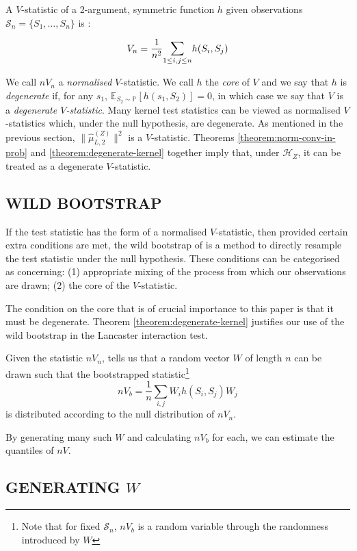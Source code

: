 \documentclass[]{article}
\begin{document}
  
A $V$-statistic of a 2-argument, symmetric function $h$ given  observations $\mathcal{S}_n = \{S_1,\ldots,S_n\}$  is \citep{serfling2009approximation}:

\[ V_n =  \frac{1}{n^2} \mathlarger{\sum}_{1\leq i,j \leq n} h(S_i,S_j)\]


We call $nV_n$ a \emph{normalised} $V$-statistic. We call $h$ the \emph{core} of $V$ and we say that $h$ is \emph{degenerate} if, for any $s_1$, $\mathbb{E}_{S_2 \sim \mathbb{P}}[h(s_1,S_2)] = 0$, in which case we say that $V$ is a \emph{degenerate $V$-statistic}. Many kernel test statistics can be viewed as normalised $V$-statistics which, under the null hypothesis, are degenerate. As mentioned in the previous section,  $\|\hat \mu^{(Z)}_{L,2}\|^2$ is a $V$-statistic. Theorems \ref{theorem:norm-conv-in-prob} and \ref{theorem:degenerate-kernel} together imply that, under $\mathcal{H}_Z$, it can be treated as a degenerate $V$-statistic. 

\subsection{WILD BOOTSTRAP}

If the test statistic has the form of a normalised $V$-statistic, then provided certain extra conditions are met, the wild bootstrap of \citet{leucht2013dependent} is a method to directly resample the test statistic under the null hypothesis. These conditions can be categorised as concerning: (1) appropriate mixing of the process from which our observations are drawn; (2) the core of the $V$-statistic. 

The condition on the core that is of crucial importance to this paper is that it must be degenerate. Theorem \ref{theorem:degenerate-kernel} justifies our use of the wild bootstrap in the Lancaster interaction test.

Given the statistic $nV_n$, \citet{leucht2013dependent} tells us that a random vector $W$ of length $n$ can be drawn such that the bootstrapped statistic\footnote{Note that for fixed $\mathcal{S}_n$, $nV_b$ is a random variable through the randomness introduced by $W$}
\[nV_b=\frac{1}{n}\sum_{i,j}W_{i}h(S_i,S_j)W_{j}\]
is distributed according to the null distribution of $nV_n$. 

By generating many such $W$ and calculating $nV_b$ for each, we can estimate the quantiles of $nV$. 

\subsection{GENERATING $W$}
\end{document}
